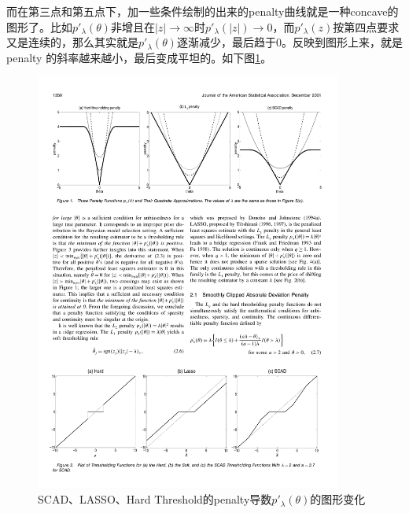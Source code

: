 ﻿\documentclass[hyperref,12pt]{ctexart}
\begin{document}
而在第三点和第五点下，加一些条件绘制的出来的penalty曲线就是一种concave的图形了。比如$p'_{\lambda}(\theta)$非增且在$|z| \rightarrow \infty$时$p'_{\lambda}(|z|) \rightarrow 0$，而$p'_{\lambda}(z)$按第四点要求又是连续的，那么其实就是$p'_{\lambda}(\theta)$逐渐减少，最后趋于0。反映到图形上来，就是penalty 的斜率越来越小，最后变成平坦的。如下图\ref{scad}。

\begin{figure}[ht]
\centering
\includegraphics[width = 0.9\textwidth]{scad.pdf}
\caption{SCAD、LASSO、Hard Threshold的penalty导数$p'_{\lambda}(\theta)$的图形变化}\label{scad}
\end{figure}
\end{document}
